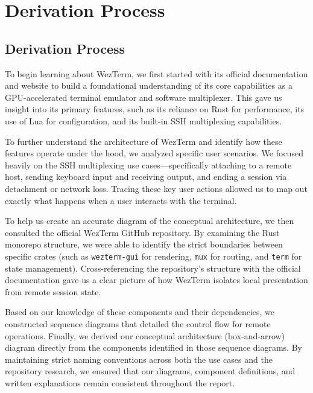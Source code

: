 \section{Derivation Process}
\label{sec:derivation}

\subsection{Derivation Process}
\label{sec:derivation-steps}

To begin learning about WezTerm, we first started with its official documentation and website \cite{wezterm-docs} to build a foundational understanding of its core capabilities as a GPU-accelerated terminal emulator and software multiplexer. This gave us insight into its primary features, such as its reliance on Rust for performance, its use of Lua for configuration, and its built-in SSH multiplexing capabilities.

To further understand the architecture of WezTerm and identify how these features operate under the hood, we analyzed specific user scenarios. We focused heavily on the SSH multiplexing use cases---specifically attaching to a remote host, sending keyboard input and receiving output, and ending a session via detachment or network loss. Tracing these key user actions allowed us to map out exactly what happens when a user interacts with the terminal.

To help us create an accurate diagram of the conceptual architecture, we then consulted the official WezTerm GitHub repository. By examining the Rust monorepo structure, we were able to identify the strict boundaries between specific crates (such as \texttt{wezterm-gui} for rendering, \texttt{mux} for routing, and \texttt{term} for state management). Cross-referencing the repository's structure with the official documentation gave us a clear picture of how WezTerm isolates local presentation from remote session state. 

Based on our knowledge of these components and their dependencies, we constructed sequence diagrams that detailed the control flow for remote operations. Finally, we derived our conceptual architecture (box-and-arrow) diagram directly from the components identified in those sequence diagrams. By maintaining strict naming conventions across both the use cases and the repository research, we ensured that our diagrams, component definitions, and written explanations remain consistent throughout the report.



